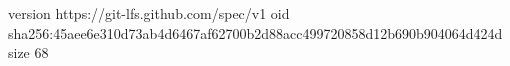 version https://git-lfs.github.com/spec/v1
oid sha256:45aee6e310d73ab4d6467af62700b2d88acc499720858d12b690b904064d424d
size 68
